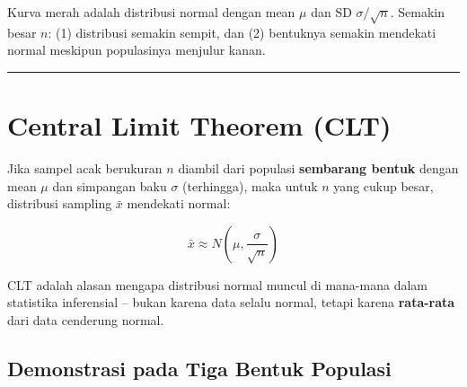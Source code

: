 \documentclass[
  indonesian,
  letterpaper,
]{book}
\begin{document}
Kurva merah adalah distribusi normal dengan mean \(\mu\) dan SD
\(\sigma/\sqrt{n}\). Semakin besar \(n\): (1) distribusi semakin sempit,
dan (2) bentuknya semakin mendekati normal meskipun populasinya menjulur
kanan.

\begin{center}\rule{0.5\linewidth}{0.5pt}\end{center}


\chapter{Central Limit Theorem (CLT)}\label{central-limit-theorem-clt}

\begin{tcolorbox}[enhanced jigsaw, arc=.35mm, bottomrule=.15mm, bottomtitle=1mm, breakable, colback=white, colbacktitle=quarto-callout-important-color!10!white, colframe=quarto-callout-important-color-frame, coltitle=black, left=2mm, leftrule=.75mm, opacityback=0, opacitybacktitle=0.6, rightrule=.15mm, title=\textcolor{quarto-callout-important-color}{\faExclamation}\hspace{0.5em}{Central Limit Theorem}, titlerule=0mm, toprule=.15mm, toptitle=1mm]

Jika sampel acak berukuran \(n\) diambil dari populasi \textbf{sembarang
bentuk} dengan mean \(\mu\) dan simpangan baku \(\sigma\) (terhingga),
maka untuk \(n\) yang cukup besar, distribusi sampling \(\bar{x}\)
mendekati normal:

\[\bar{x} \approx N\left(\mu, \frac{\sigma}{\sqrt{n}}\right)\]

\end{tcolorbox}

CLT adalah alasan mengapa distribusi normal muncul di mana-mana dalam
statistika inferensial -- bukan karena data selalu normal, tetapi karena
\textbf{rata-rata} dari data cenderung normal.

\section{Demonstrasi pada Tiga Bentuk
Populasi}\label{demonstrasi-pada-tiga-bentuk-populasi}
\end{document}
